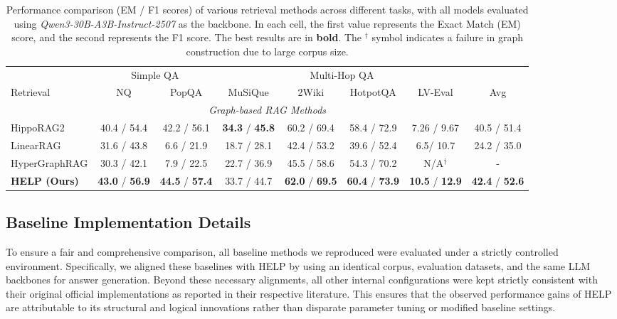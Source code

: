 \begin{table}[h]
    \centering
    \caption{Performance comparison (EM / F1 scores) of various retrieval methods across different tasks, with all models evaluated using \textit{Qwen3-30B-A3B-Instruct-2507} as the backbone. In each cell, the first value represents the Exact Match (EM) score, and the second represents the F1 score. The best results are in \textbf{bold}. The $^\dagger$ symbol indicates a failure in graph construction due to large corpus size.}
    \label{tab:results_qwen}
    \small
    \vspace{-5pt}
    \begin{tabular}{l cccccc c}
        \toprule
        & \multicolumn{2}{c}{Simple QA} & \multicolumn{4}{c}{Multi-Hop QA} & \\
        \cmidrule(lr){2-3} \cmidrule(lr){4-7}
        Retrieval & NQ & PopQA & MuSiQue & 2Wiki & HotpotQA & LV-Eval & Avg \\
        \midrule
        \multicolumn{8}{c}{\textit{Graph-based RAG Methods}} \\
        \midrule
        HippoRAG2 \cite{gutierrez2025rag} & 40.4 / 54.4 & 42.2 / 56.1 & \textbf{34.3} / \textbf{45.8} & 60.2 / 69.4 & 58.4 / 72.9 & 7.26 / 9.67 & 40.5 / 51.4 \\
        LinearRAG \cite{zhuang2025linearrag} & 31.6 / 43.8 & 6.6 / 21.9 & 18.7 / 28.1 & 42.4 / 53.2 & 39.6 / 52.4 & 6.5/ 10.7 & 24.2 / 35.0 \\
        HyperGraphRAG \cite{luo2025hypergraphrag} & 30.3 / 42.1 & 7.9 / 22.5 & 22.7 / 36.9 & 45.5 / 58.6 & 54.3 / 70.2 & N/A$^\dagger$ & - \\
        \midrule
        \rowcolor{blue!10} \textbf{HELP (Ours)} & \textbf{43.0} / \textbf{56.9} & \textbf{44.5} / \textbf{57.4} & 33.7 / 44.7 & \textbf{62.0} / \textbf{69.5} & \textbf{60.4} / \textbf{73.9} & \textbf{10.5} / \textbf{12.9} & \textbf{42.4} / \textbf{52.6} \\
        \bottomrule
    \end{tabular}
\end{table}

\subsection{Baseline Implementation Details}\label{appendix: baselines}
To ensure a fair and comprehensive comparison, all baseline methods we reproduced were evaluated under a strictly controlled environment. Specifically, we aligned these baselines with HELP by using an identical corpus, evaluation datasets, and the same LLM backbones for answer generation. Beyond these necessary alignments, all other internal configurations were kept strictly consistent with their original official implementations as reported in their respective literature. This ensures that the observed performance gains of HELP are attributable to its structural and logical innovations rather than disparate parameter tuning or modified baseline settings.


